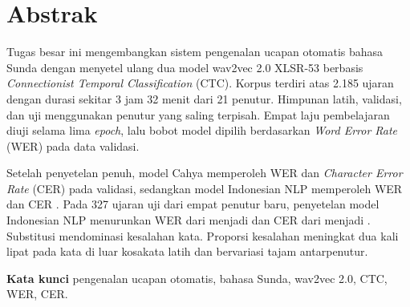 \chapter*{Abstrak}

Tugas besar ini mengembangkan sistem pengenalan ucapan otomatis bahasa Sunda dengan menyetel ulang dua model wav2vec 2.0 XLSR-53 berbasis \textit{Connectionist Temporal Classification} (CTC). Korpus terdiri atas 2.185 ujaran dengan durasi sekitar 3 jam 32 menit dari 21 penutur. Himpunan latih, validasi, dan uji menggunakan penutur yang saling terpisah. Empat laju pembelajaran diuji selama lima \textit{epoch}, lalu bobot model dipilih berdasarkan \textit{Word Error Rate} (WER) pada data validasi.

Setelah penyetelan penuh, model Cahya memperoleh WER  dan \textit{Character Error Rate} (CER)  pada validasi, sedangkan model Indonesian NLP memperoleh WER  dan CER . Pada 327 ujaran uji dari empat penutur baru, penyetelan model Indonesian NLP menurunkan WER dari  menjadi  dan CER dari  menjadi . Substitusi mendominasi kesalahan kata. Proporsi kesalahan meningkat dua kali lipat pada kata di luar kosakata latih dan bervariasi tajam antarpenutur.

\medskip
\noindent\textbf{Kata kunci} \enspace pengenalan ucapan otomatis, bahasa Sunda, wav2vec 2.0, CTC, WER, CER.
